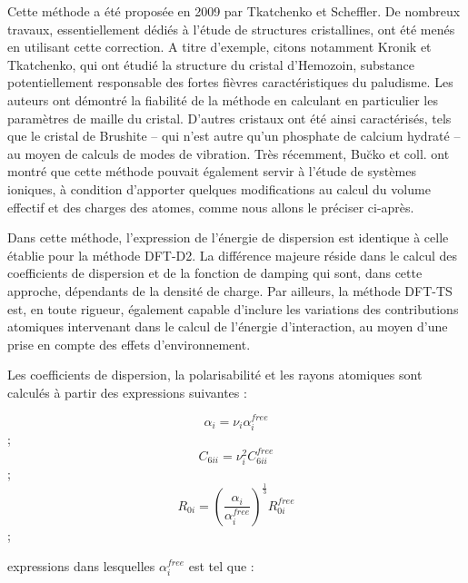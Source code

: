 \documentclass[12pt,a4paper]{book}
\begin{document}
{	Cette méthode a été proposée en 2009 par Tkatchenko et Scheffler\cite{tkatchenko2009accurate}. De nombreux travaux, essentiellement dédiés à l’étude de structures cristallines, ont été menés en utilisant cette correction. A titre d'exemple, citons notamment Kronik et Tkatchenko\cite{kronik2014understanding}, qui ont étudié la structure du cristal d'Hemozoin, substance potentiellement responsable des fortes fièvres caractéristiques du paludisme. Les auteurs ont démontré la fiabilité de la méthode en calculant en particulier les paramètres de maille du cristal. D’autres cristaux ont été ainsi caractérisés, tels que le cristal de Brushite -- qui n’est autre qu’un phosphate de calcium hydraté -- au moyen de calculs de modes de vibration. Très récemment, Bu\u{c}ko et coll. \cite{buvcko2014extending} ont montré que cette méthode pouvait également servir à l’étude de systèmes ioniques, à condition d’apporter quelques modifications au calcul du volume effectif et des charges des atomes, comme nous allons le préciser ci-après. 
	
	Dans cette méthode, l’expression de l'énergie de dispersion est identique à celle établie pour la méthode DFT-D2. La différence majeure réside dans le calcul des coefficients de dispersion et de la fonction de damping qui sont, dans cette approche, dépendants de la densité de charge. Par ailleurs, la méthode DFT-TS est, en toute rigueur, également capable d'inclure les variations des contributions atomiques intervenant dans le calcul de l’énergie d’interaction, au moyen d'une prise en compte des effets d'environnement. 
	
	Les coefficients de dispersion, la polarisabilité et les rayons atomiques sont calculés à partir des expressions suivantes :
	
	\begin{multicols}{3}
		\begin{equation} \alpha_{i} = \nu_{i} \alpha_{i}^{free} \end{equation};
		\begin{equation} C_{6ii} = \nu_{i}^{2} C_{6ii}^{free} \end{equation}; 
		\begin{equation} R_{0i} = \left(\frac{\alpha_{i}}{\alpha_{i}^{free}}\right)^{\frac{1}{3}} R_{0i}^{free} \end{equation}; 
	\end{multicols}
	
	\noindent expressions dans lesquelles $\alpha_{i}^{free}$ est tel que :
	
}
\end{document}
